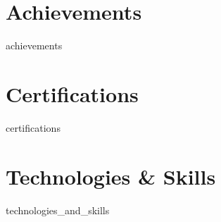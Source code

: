 \documentclass[10pt, letterpaper]{article}
\begin{document}
    \section{Achievements}
    {{achievements}}

    \section{Certifications}
    {{certifications}}

    \section{Technologies \& Skills}
    {{technologies_and_skills}}
\end{document}
